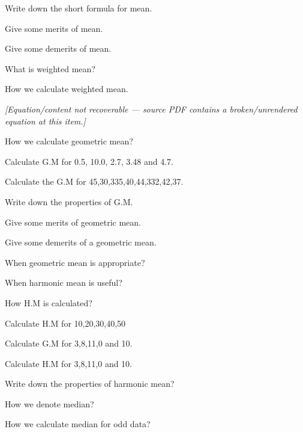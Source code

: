 \documentclass[11pt,a4paper]{article}
\begin{document}
\begin{shortlist}
\item Write down the short formula for mean.

\item Give some merits of mean.

\item Give some demerits of mean.

\item What is weighted mean?

\item How we calculate weighted mean.

\item \textit{[Equation/content not recoverable --- source PDF contains a broken/unrendered equation at this item.]}

\item How we calculate geometric mean?

\item Calculate G.M for 0.5, 10.0, 2.7, 3.48 and 4.7.

\item Calculate the G.M for 45,30,335,40,44,332,42,37.

\item Write down the properties of G.M.

\item Give some merits of geometric mean.

\item Give some demerits of a geometric mean.

\item When geometric mean is appropriate?

\item When harmonic mean is useful?

\item How H.M is calculated?

\item Calculate H.M for 10,20,30,40,50

\item Calculate G.M for 3,8,11,0 and 10.

\item Calculate H.M for 3,8,11,0 and 10.

\item Write down the properties of harmonic mean?

\item How we denote median?

\item How we calculate median for odd data?


\end{shortlist}
\end{document}
